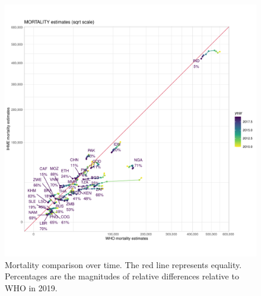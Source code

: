 \documentclass[12pt]{article}
\begin{document}
\FloatBarrier

\begin{figure}
  \centering
  \includegraphics[width=1\textwidth]{../plots/aF2b.pdf}
  \caption[Mortality comparison over time]{Mortality comparison over time. The
    red line represents equality. \\ Percentages are the magnitudes of relative differences
    relative to WHO in 2019.}
\end{figure}

\FloatBarrier
\end{document}
